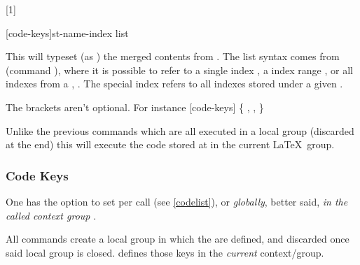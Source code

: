 \documentclass{article}
\begin{document}
[1]



\begin{codedescribe}[code,new=2025/04/29]{\tsmergedcode*}
	\begin{codesyntax}%
		\tsmacro{\tsmergedcode*}[code-keys]{st-name-index list}
	\end{codesyntax}
This will typeset (as \tsobj{\tscode}) the merged contents from . The list syntax comes from  (command \tsobj{\mergesc}), where it is possible to refer to a single index , a index range , or all indexes from a , . The special index  refers to all indexes stored under a given .
\end{codedescribe}
\begin{tsremark}
  The brackets aren't optional. For instance \tsmacro{\tsmergedcode*}[code-keys]{} {\color{red}\{}  ,  ,  {\color{red}\}}
\end{tsremark}
\begin{codedescribe}[code,new=2025/04/29]{\tsexec}
	\begin{codesyntax}%
		\tsargs[oarg]{index}
	\end{codesyntax}
Unlike the previous commands which are all executed in a local group (discarded at the end) this will execute the code stored at  in the current \LaTeX\  group.

\end{codedescribe}



\subsubsection{Code Keys}\label{code-keys}

\begin{codedescribe}{\setcodekeys}
	\begin{codesyntax}%
		\tsmacro{\setcodekeys}{code-keys}
	\end{codesyntax}

One has the option to set   per \tsobj{\tscode,\tsmergedcode,\tsdemo,\tsresult} call (see \ref{codelist}), or \emph{globally}, better said, \emph{in the called context group} .

\begin{tsremark}[N.B.:]
All \tsobj[code]{\tscode,\tsdemo} commands create a local group  in which the  are defined, and discarded once said local group is closed. \tsmacro{\setcodekeys}{} defines those keys in the \emph{current} context/group.
\end{tsremark}
\end{codedescribe}
\end{document}

